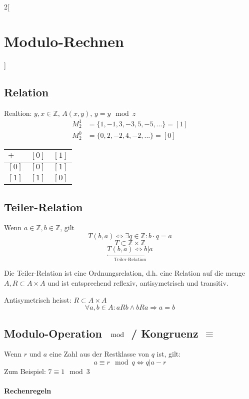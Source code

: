 \begin{multicols}{2}[
	\section{Modulo-Rechnen}
]

\subsection{Relation}
	Realtion: $y,x \in \mathbb{Z}$, $A(x,y)$, $y = y \mod z$
	\begin{align*}
		M_2^1 &= \{1,-1,3,-3,5,-5,...\} = [1] \\
		M_2^0 &= \{0,2,-2,4,-2,...\} = [0]
	\end{align*}
	
	\begin{tabular}{l|r r}
		$+$ & $[0]$ & $[1]$  \\ \hline
		$[0]$ & $[0]$ & $[1]$ \\
		$[1]$ & $[1]$ & $[0]$
	\end{tabular}
	

\subsection{Teiler-Relation}
	Wenn $a \in \mathbb{Z}, b \in \mathbb{Z}$, gilt
	\[
		T(b,a) \Leftrightarrow \exists q \in \mathbb{Z}: b \cdot q = a
	\]
	\[ T \subset \mathbb{Z} \times \mathbb{Z} \]
	\[
		\underbracket{T(b,a) \Leftrightarrow b|a}_{\text{Teiler-Relation}}
	\]
	
	Die Teiler-Relation ist eine Ordnungsrelation, d.h. eine Relation auf die menge $A, R \subset A \times A$ und ist entsprechend reflexiv, antisymetrisch und transitiv.

	Antisymetrisch heisst: $R \subset A \times A$
	\[
		\forall a, b \in A: a R b \land b R a \Rightarrow a=b
	\]

\subsection{Modulo-Operation $\mod$ / Kongruenz $\equiv$}
	Wenn $r$ und $a$ eine Zahl aus der Restklasse von $q$ ist, gilt:
	\[
		a \equiv r \mod q \Leftrightarrow q | a-r
	\]
	Zum Beispiel: $7 \equiv 1 \mod 3$

	\paragraph{Rechenregeln}
	

\end{multicols}
